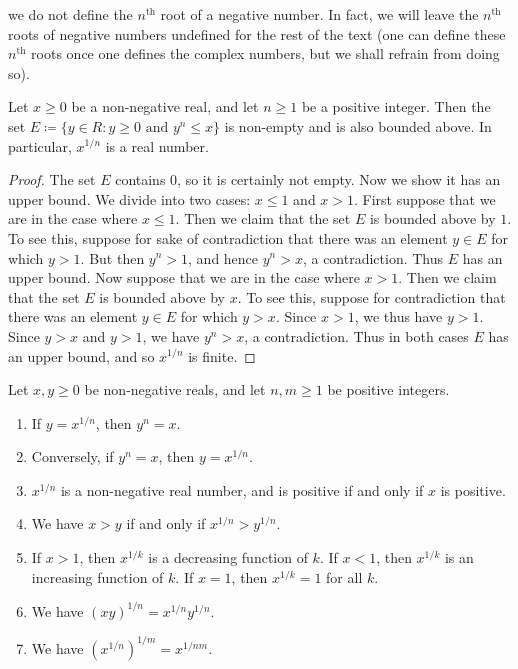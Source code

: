 \begin{note}
we do not define the \(n^{\text{th}}\) root of a negative number.
In fact, we will leave the \(n^{\text{th}}\) roots of negative numbers undefined for the rest of the text
(one can define these \(n^{\text{th}}\) roots once one defines the complex numbers, but we shall refrain from doing so).
\end{note}

\begin{lemma}\label{5.6.5}
Let \(x \geq 0\) be a non-negative real, and let \(n \geq 1\) be a positive integer.
Then the set \(E \coloneqq \{y \in R : y \geq 0 \text{ and } y^n \leq x\}\) is non-empty and is also bounded above.
In particular, \(x^{1 / n}\) is a real number.
\end{lemma}

\begin{proof}
The set \(E\) contains \(0\), so it is certainly not empty.
Now we show it has an upper bound.
We divide into two cases: \(x \leq 1\) and \(x > 1\).
First suppose that we are in the case where \(x \leq 1\).
Then we claim that the set \(E\) is bounded above by \(1\).
To see this, suppose for sake of contradiction that there was an element \(y \in E\) for which \(y > 1\).
But then \(y^n > 1\), and hence \(y^n > x\), a contradiction.
Thus \(E\) has an upper bound.
Now suppose that we are in the case where \(x > 1\).
Then we claim that the set \(E\) is bounded above by \(x\).
To see this, suppose for contradiction that there was an element \(y \in E\) for which \(y > x\).
Since \(x > 1\), we thus have \(y > 1\).
Since \(y > x\) and \(y > 1\), we have \(y^n > x\), a contradiction.
Thus in both cases \(E\) has an upper bound, and so \(x^{1 / n}\) is finite.
\end{proof}

\begin{lemma}\label{5.6.6}
Let \(x, y \geq 0\) be non-negative reals, and let \(n, m \geq 1\) be positive integers.
\begin{enumerate}
    \item If \(y = x^{1 / n}\), then \(y^n = x\).
    \item Conversely, if \(y^n = x\), then \(y = x^{1 / n}\).
    \item \(x^{1 / n}\) is a non-negative real number, and is positive if and only if \(x\) is positive.
    \item We have \(x > y\) if and only if \(x^{1 / n} > y^{1 / n}\).
    \item If \(x > 1\), then \(x^{1 / k}\) is a decreasing function of \(k\).
    If \(x < 1\), then \(x^{1 / k}\) is an increasing function of \(k\).
    If \(x = 1\), then \(x^{1 / k} = 1\) for all \(k\).
    \item We have \((xy)^{1 / n} = x^{1 / n} y^{1 / n}\).
    \item We have \((x^{1 / n})^{1 / m} = x^{1 / nm}\).
\end{enumerate}
\end{lemma}


